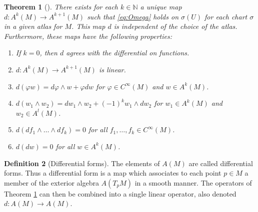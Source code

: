 \documentclass[reqno]{amsart}
\newtheorem{theorem}{Theorem}[section]
\theoremstyle{definition}
\newtheorem{definition}[theorem]{Definition}
\theoremstyle{remark}
\begin{document}
      \begin{theorem}[]\label{Thm:LXOOXa1}
          There exists for each $k \in \mathbb{N} $ a unique
          map $d \colon A^{k}(M) \to A^{k+1}(M)$ such that
          \eqref{eq:Omega} holds on $\sigma (U)$ for each
          chart $\sigma$ in a given atlas
          for $M$. This map $d$ is independent of the
          choice of the atlas. Furthermore, these
          maps have the following properties:
          \begin{enumerate}
              \item If $k = 0$, then $d$ agrees with the
                  differential on functions.
              \item $d \colon A^{k}(M) \to 
                  A^{k+1}(M)$ is linear.
              \item $d\left( \varphi w \right) =
                  d \varphi \wedge w + \varphi dw$ for
                  $\varphi \in C^{\infty}(M)$ and
                  $w \in A^{k}(M)$.
              \item $d\left( w_1 \wedge w_2 \right) =
                  dw_1 \wedge w_2 + (-1)^{k} w_1 \wedge
                  dw_2$ for $w_1 \in A^{k}(M)$ and
                  $w_2 \in A^{l}(M)$.
              \item $d\left( df_1 \wedge \ldots \wedge
                  df_k\right) = 0$ for all
                  $f_1,\ldots, f_k \in C^{\infty}(M)$.
              \item $d \left( dw \right) = 0$ for all
                  $w \in A^{k}(M)$.
          \end{enumerate}
      \end{theorem}


      \begin{definition}[Differential forms]
          The elements of $A(M)$ are called differential forms.
          Thus a differential form is a map which associates
          to each point $p \in M$ a member of the exterior
          algebra $A\left( T_pM \right) $ in a smooth
          manner. The operators of 
          Theorem \ref{Thm:LXOOXa1} can then be combined
          into a single linear operator, also denoted
          $d \colon A(M) \to A(M)$.
      \end{definition}





















\end{document}
